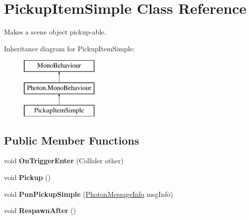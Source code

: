 \hypertarget{class_pickup_item_simple}{}\section{Pickup\+Item\+Simple Class Reference}
\label{class_pickup_item_simple}


Makes a scene object pickup-\/able.  


Inheritance diagram for Pickup\+Item\+Simple\+:\begin{figure}[H]
\begin{center}
\leavevmode
\includegraphics[height=3.000000cm]{class_pickup_item_simple}
\end{center}
\end{figure}
\subsection*{Public Member Functions}
\begin{DoxyCompactItemize}
\item 
void {\bfseries On\+Trigger\+Enter} (Collider other)\hypertarget{class_pickup_item_simple_a881d6f64f61dec99bef0c5a473efb614}{}\label{class_pickup_item_simple_a881d6f64f61dec99bef0c5a473efb614}

\item 
void {\bfseries Pickup} ()\hypertarget{class_pickup_item_simple_af3b7fe505e0a4e7ecd587bad9051a0b8}{}\label{class_pickup_item_simple_af3b7fe505e0a4e7ecd587bad9051a0b8}

\item 
void {\bfseries Pun\+Pickup\+Simple} (\hyperlink{class_photon_message_info}{Photon\+Message\+Info} msg\+Info)\hypertarget{class_pickup_item_simple_afab04ad30638068aaf6676f00aa8645c}{}\label{class_pickup_item_simple_afab04ad30638068aaf6676f00aa8645c}

\item 
void {\bfseries Respawn\+After} ()\hypertarget{class_pickup_item_simple_a54b4d90b309c5abbecbbf65f9d792bab}{}\label{class_pickup_item_simple_a54b4d90b309c5abbecbbf65f9d792bab}

\end{DoxyCompactItemize}
